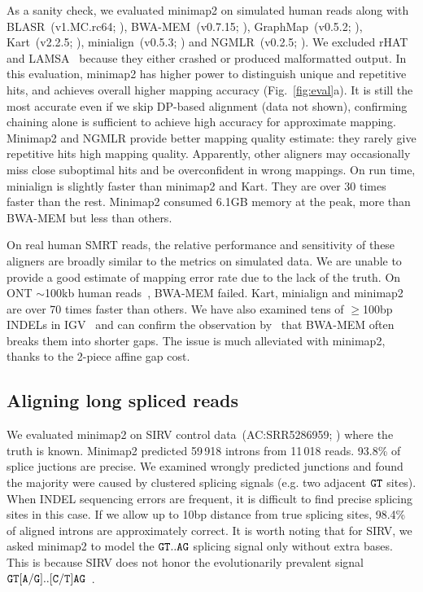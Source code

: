 \documentclass{bioinfo}
\begin{document}
As a sanity check, we evaluated minimap2 on simulated human reads along with
BLASR~(v1.MC.rc64; \citealp{Chaisson:2012aa}),
BWA-MEM~(v0.7.15; \citealp{Li:2013aa}),
GraphMap~(v0.5.2; \citealp{Sovic:2016aa}),
Kart~(v2.2.5; \citealp{Lin:2017aa}),
minialign~(v0.5.3; \citealp{Suzuki:2016}) and
NGMLR~(v0.2.5; \citealp{Sedlazeck169557}). We excluded rHAT~\citep{Liu:2016ab}
and LAMSA~\citep{Liu:2017aa} because they either
crashed or produced malformatted output. In this evaluation, minimap2 has
higher power to distinguish unique and repetitive hits, and achieves overall
higher mapping accuracy (Fig.~\ref{fig:eval}a). It is still the most accurate
even if we skip DP-based alignment (data not shown), confirming chaining alone
is sufficient to achieve high accuracy for approximate mapping. Minimap2 and
NGMLR provide better mapping quality estimate: they rarely give repetitive hits
high mapping quality.  Apparently, other aligners may
occasionally miss close suboptimal hits and be overconfident in wrong mappings.
On run time, minialign is slightly faster than minimap2 and Kart. They are over
30 times faster than the rest.  Minimap2 consumed 6.1GB memory at the peak,
more than BWA-MEM but less than others.

On real human SMRT reads, the relative performance and sensitivity of
these aligners are broadly similar to the metrics on simulated data. We are
unable to provide a good estimate of mapping error rate due to the lack of the
truth.  On ONT $\sim$100kb human reads~\citep{Jain128835}, BWA-MEM failed.
Kart, minialign and minimap2 are over 70 times faster than others. We have also
examined tens of $\ge$100bp INDELs in IGV~\citep{Robinson:2011aa} and can
confirm the observation by~\citet{Sedlazeck169557} that BWA-MEM often breaks
them into shorter gaps. The issue is much alleviated with minimap2, thanks
to the 2-piece affine gap cost.

\subsection{Aligning long spliced reads}

We evaluated minimap2 on SIRV control data~(AC:SRR5286959;
\citealp{Byrne:2017aa}) where the truth is known. Minimap2 predicted 59\,918
introns from 11\,018 reads. 93.8\% of splice juctions are precise. We examined
wrongly predicted junctions and found the majority were caused by clustered
splicing signals (e.g. two adjacent ${\tt GT}$ sites). When INDEL sequencing
errors are frequent, it is difficult to find precise splicing sites in this
case. If we allow up to 10bp distance from true splicing sites, 98.4\% of
aligned introns are approximately correct. It is worth noting that for SIRV, we
asked minimap2 to model the ${\tt GT..AG}$ splicing signal only without extra
bases. This is because SIRV does not honor the evolutionarily prevalent signal
${\tt GT[A/G]..[C/T]AG}$~\citep{Irimia:2008aa}.
\end{document}
